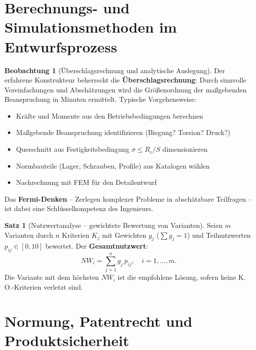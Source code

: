 ﻿\documentclass[a4paper,12pt]{report}
\theoremstyle{definition}
\newtheorem{satz}{Satz}
\newtheorem{beobachtung}{Beobachtung}
\begin{document}
\section{Berechnungs- und Simulationsmethoden im Entwurfsprozess}

\begin{beobachtung}[Überschlagsrechnung und analytische Auslegung]
Der erfahrene Konstrukteur beherrscht die \textbf{Überschlagsrechnung}:
Durch sinnvolle Vereinfachungen und Abschätzungen wird die Größenordnung
der maßgebenden Beanspruchung in Minuten ermittelt.
Typische Vorgehensweise:
\begin{itemize}
    \item[-] Kräfte und Momente aus den Betriebsbedingungen berechnen
    \item[-] Maßgebende Beanspruchung identifizieren (Biegung? Torsion? Druck?)
    \item[-] Querschnitt aus Festigkeitsbedingung $\sigma \le R_e/S$ dimensionieren
    \item[-] Normbauteile (Lager, Schrauben, Profile) aus Katalogen wählen
    \item[-] Nachrechnung mit FEM für den Detailentwurf
\end{itemize}
Das \textbf{Fermi-Denken} -- Zerlegen komplexer Probleme in abschätzbare
Teilfragen -- ist dabei eine Schlüsselkompetenz des Ingenieurs.
\end{beobachtung}

\begin{satz}[Nutzwertanalyse -- gewichtete Bewertung von Varianten]
Seien $m$ Varianten durch $n$ Kriterien $K_j$ mit Gewichten $g_j$ ($\sum g_j = 1$)
und Teilnutzwerten $p_{ij} \in [0, 10]$ bewertet. Der \textbf{Gesamtnutzwert}:
\[
  NW_i = \sum_{j=1}^n g_j\,p_{ij}, \quad i = 1, \ldots, m.
\]
Die Variante mit dem höchsten $NW_i$ ist die empfohlene Lösung,
sofern keine K.\,O.-Kriterien verletzt sind.
\end{satz}

\section{Normung, Patentrecht und Produktsicherheit}
\end{document}
